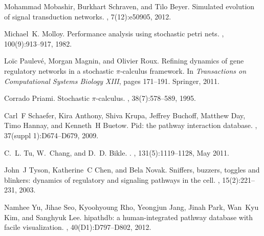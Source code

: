 \documentclass[runningheads,a4paper]{llncs}
\begin{document}
\begin{thebibliography}{4}
Mohammad Mobashir, Burkhart Schraven, and Tilo Beyer.
\newblock Simulated evolution of signal transduction networks.
, 7(12):e50905, 2012.

Michael~K. Molloy.
\newblock Performance analysis using stochastic petri nets.
, 100(9):913--917, 1982.

{L}o{\"i}c {P}aulev{\'e}, {M}organ {M}agnin, and {O}livier {R}oux.
\newblock Refining dynamics of gene regulatory networks in a stochastic
  $\pi$-calculus framework.
\newblock In {\em Transactions on Computational Systems Biology XIII}, pages
  171--191. Springer, 2011.

Corrado Priami.
\newblock Stochastic $\pi$-calculus.
, 38(7):578--589, 1995.

Carl~F Schaefer, Kira Anthony, Shiva Krupa, Jeffrey Buchoff, Matthew Day, Timo
  Hannay, and Kenneth~H Buetow.
\newblock Pid: the pathway interaction database.
, 37(suppl 1):D674--D679, 2009.

C.~L. Tu, W.~Chang, and D.~D. Bikle.
.
, 131(5):1119--1128, May 2011.

John~J Tyson, Katherine~C Chen, and Bela Novak.
\newblock Sniffers, buzzers, toggles and blinkers: dynamics of regulatory and
  signaling pathways in the cell.
, 15(2):221--231, 2003.

Namhee Yu, Jihae Seo, Kyoohyoung Rho, Yeongjun Jang, Jinah Park, Wan~Kyu Kim,
  and Sanghyuk Lee.
\newblock hipathdb: a human-integrated pathway database with facile
  visualization.
, 40(D1):D797--D802, 2012.

\end{thebibliography}
\end{document}
